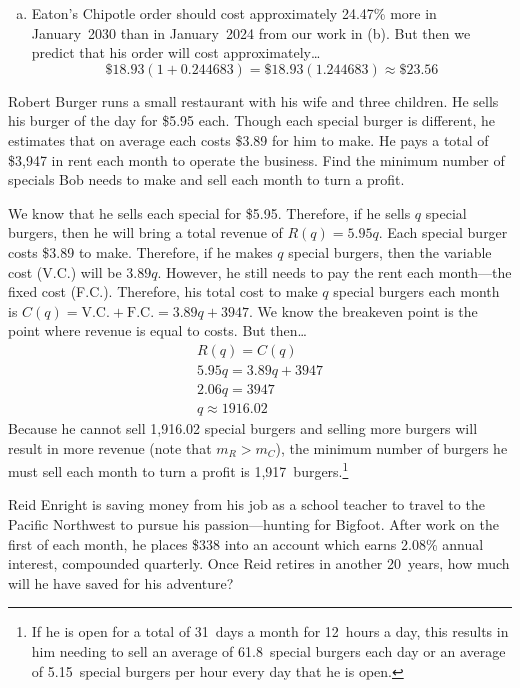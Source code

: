 \documentclass[12pt,letterpaper]{exam}
\begin{document}
\begin{questions}
\begin{enumerate}[(a)]
\item Eaton's Chipotle order should cost approximately 24.47\% more in January~2030 than in January~2024 from our work in (b). But then we predict that his order will cost approximately\dots
	\[
	\$18.93 (1 + 0.244683)= \$18.93(1.244683) \approx \$23.56
	\]
\end{enumerate}



\newpage
\question[15] Robert Burger runs a small restaurant with his wife and three children. He sells his burger of the day for \$5.95 each. Though each special burger is different, he estimates that on average each costs \$3.89 for him to make. He pays a total of \$3,947 in rent each month to operate the business. Find the minimum number of specials Bob needs to make and sell each month to turn a profit. \pspace

\sol We know that he sells each special for \$5.95. Therefore, if he sells $q$ special burgers, then he will bring a total revenue of $R(q)= 5.95q$. Each special burger costs \$3.89 to make. Therefore, if he makes $q$ special burgers, then the variable cost (V.C.) will be $3.89q$. However, he still needs to pay the rent each month---the fixed cost (F.C.). Therefore, his total cost to make $q$ special burgers each month is $C(q)= \text{V.C.} + \text{F.C.}= 3.89q + 3947$. We know the breakeven point is the point where revenue is equal to costs. But then\dots
	\[
	\begin{gathered}
	R(q)= C(q) \\[0.3cm]
	5.95q= 3.89q + 3947 \\[0.3cm]
	2.06q= 3947 \\[0.3cm]
	q \approx 1916.02
	\end{gathered}
	\]
Because he cannot sell 1,916.02 special burgers and selling more burgers will result in more revenue (note that $m_R > m_C$), the minimum number of burgers he must sell each month to turn a profit is 1,917~burgers.\footnote{If he is open for a total of 31~days a month for 12~hours a day, this results in him needing to sell an average of 61.8~special burgers each day or an average of 5.15~special burgers per hour every day that he is open.}



\newpage
\question[15] Reid Enright is saving money from his job as a school teacher to travel to the Pacific Northwest to pursue his passion---hunting for Bigfoot. After work on the first of each month, he places \$338 into an account which earns 2.08\% annual interest, compounded quarterly. Once Reid retires in another 20~years, how much will he have saved for his adventure? \pspace


\end{questions}
\end{document}
